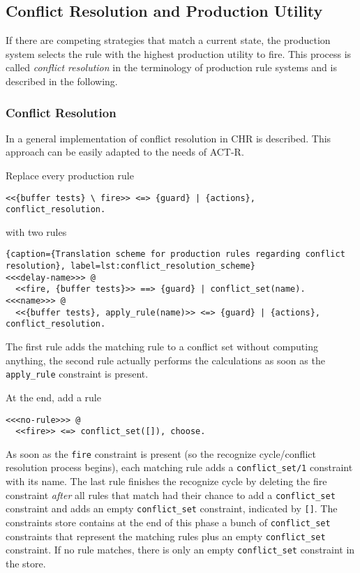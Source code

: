\subsection{Conflict Resolution and Production Utility}

If there are competing strategies that match a current state, the production system selects the rule with the highest production utility to fire. This process is called \emph{conflict resolution} in the terminology of production rule systems and is described in the following.

\subsubsection{Conflict Resolution}

In \cite[151\psqq]{fru_chr_book_2009} a general implementation of conflict resolution in CHR is described. This approach can be easily adapted to the needs of ACT-R.

Replace every production rule

\begin{lstlisting}
<<{buffer tests} \ fire>> <=> {guard} | {actions}, conflict_resolution.
\end{lstlisting}

with two rules

\begin{lstlisting}{caption={Translation scheme for production rules regarding conflict resolution}, label=lst:conflict_resolution_scheme}
<<<delay-name>>> @
  <<fire, {buffer tests}>> ==> {guard} | conflict_set(name).
<<<name>>> @
  <<{buffer tests}, apply_rule(name)>> <=> {guard} | {actions}, conflict_resolution.
\end{lstlisting}

The first rule adds the matching rule to a conflict set without computing anything, the second rule actually performs the calculations as soon as the \lstinline|apply_rule| constraint is present.

At the end, add a rule

\begin{lstlisting}
<<<no-rule>>> @
  <<fire>> <=> conflict_set([]), choose.
\end{lstlisting}

As soon as the \lstinline|fire| constraint is present (so the recognize cycle/conflict resolution process begins), each matching rule adds a \lstinline|conflict_set/1| constraint with its name. The last rule finishes the recognize cycle by deleting the fire constraint \emph{after} all rules that match had their chance to add a \lstinline|conflict_set| constraint and adds an empty \lstinline|conflict_set| constraint, indicated by \lstinline|[]|. The constraints store contains at the end of this phase a bunch of \lstinline|conflict_set| constraints that represent the matching rules plus an empty \lstinline|conflict_set| constraint. If no rule matches, there is only an empty \lstinline|conflict_set| constraint in the store.

